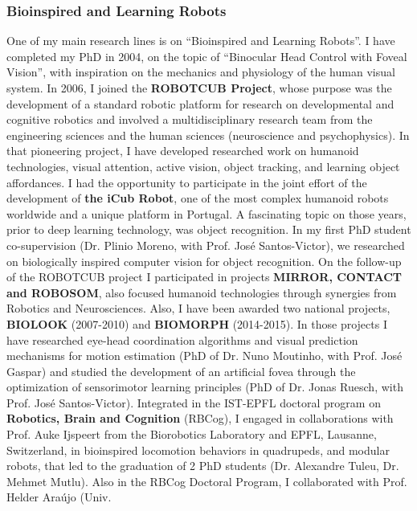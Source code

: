 \documentclass[
]{article}
\begin{document}
\subsubsection*{Bioinspired and Learning
Robots}\label{bioinspired-and-learning-robots}

One of my main research lines is on ``Bioinspired and Learning Robots''.
I have completed my PhD in 2004, on the topic of ``Binocular Head
Control with Foveal Vision'', with inspiration on the mechanics and
physiology of the human visual system. In 2006, I joined the
\textbf{ROBOTCUB Project}, whose purpose was the development of a
standard robotic platform for research on developmental and cognitive
robotics and involved a multidisciplinary research team from the
engineering sciences and the human sciences (neuroscience and
psychophysics). In that pioneering project, I have developed researched
work on humanoid technologies, visual attention, active vision, object
tracking, and learning object affordances. I had the opportunity to
participate in the joint effort of the development of \textbf{the iCub
Robot}, one of the most complex humanoid robots worldwide and a unique
platform in Portugal. A fascinating topic on those years, prior to deep
learning technology, was object recognition. In my first PhD student
co-supervision (Dr. Plinio Moreno, with Prof. José Santos-Victor), we
researched on biologically inspired computer vision for object
recognition. On the follow-up of the ROBOTCUB project I participated in
projects \textbf{MIRROR, CONTACT and ROBOSOM}, also focused humanoid
technologies through synergies from Robotics and Neurosciences. Also, I
have been awarded two national projects, \textbf{BIOLOOK} (2007-2010)
and \textbf{BIOMORPH} (2014-2015). In those projects I have researched
eye-head coordination algorithms and visual prediction mechanisms for
motion estimation (PhD of Dr. Nuno Moutinho, with Prof. José Gaspar) and
studied the development of an artificial fovea through the optimization
of sensorimotor learning principles (PhD of Dr. Jonas Ruesch, with Prof.
José Santos-Victor). Integrated in the IST-EPFL doctoral program on
\textbf{Robotics, Brain and Cognition} (RBCog), I engaged in
collaborations with Prof. Auke Ijspeert from the Biorobotics Laboratory
and EPFL, Lausanne, Switzerland, in bioinspired locomotion behaviors in
quadrupeds, and modular robots, that led to the graduation of 2 PhD
students (Dr. Alexandre Tuleu, Dr. Mehmet Mutlu). Also in the RBCog
Doctoral Program, I collaborated with Prof. Helder Araújo (Univ.
\end{document}
